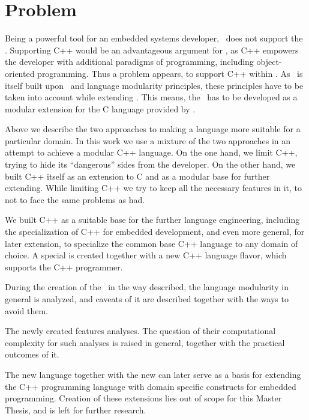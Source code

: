 \section{Problem}

Being a powerful tool for an embedded systems developer, \mbdr\ does not support the \cpppl. Supporting C++ would be an
advantageous argument for \mbdr, as C++ empowers the developer with additional paradigms of programming, including 
object-oriented programming. Thus a problem appears, to support C++ within \mbdr. As \mbdr\ is itself built upon
\jbmps\ and language modularity principles, these principles have to be taken into account while extending \mbdr.
This means, the \cpppl\ has to be developed as a modular extension for the C language provided by \mbdr.




Above we describe the two approaches to making a language more suitable for a particular domain. In this work we use a mixture of 
the two approaches in an  attempt to achieve a modular C++ language. On the one hand, we limit C++, trying to hide its ``dangerous'' sides 
from the developer. On the other hand, we built C++ itself as an extension to C and as a modular base for further extending. While limiting 
C++ we try to keep all the necessary features in it, to not to face the same problems as  had.

We built C++ as a suitable base for the further language engineering, including the specialization  of C++ for embedded development, 
and even more general, for later extension, to specialize the common base C++ language to any domain of choice. A special  is created 
together with a new C++ language flavor, which supports the C++ programmer.

During the creation of the \cpppl\ in the way described, the language modularity in general is analyzed, and caveats of it
are described together with the ways to avoid them.

The newly created  features analyses. The question of their computational complexity for such analyses 
is raised in general, together with the practical outcomes of it.

The new language together with the new  can later serve as a basis for extending the C++ programming 
language with domain specific constructs for embedded programming. Creation of these extensions lies out of scope
for this Master Thesis, and is left for further research.


